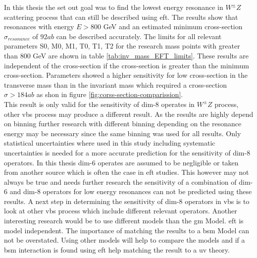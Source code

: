 \documentclass[../Bachelorarbeit.tex]{subfiles}
\begin{document}
\label{sec:summery}
In this thesis the set out goal was to find the lowest energy resonance in $W^{\pm}Z$ scattering process that can still be described using \acrshort{eft}.
The results show that resonances with energy $E>800$ GeV and an estimated minimum cross-section $\sigma_{resonance}$ of $92 ab$ can be described accurately.
The limits for all relevant parameters S0, M0, M1, T0, T1, T2 for the research mass points with greater than 800 GeV are shown in table \ref{tab:inv_mass_EFT_limits}.
These results are independent of the cross-section if the cross-section is greater than the minimum cross-section. Parameters showed a higher sensitivity for low cross-section
in the transverse mass than in the invariant mass which required a cross-section $\sigma>184 ab$ as shon in figure \ref{fig:corss-section-comparission}.\\
This result is only valid for the sensitivity of dim-8 operates in $W^{\pm}Z$ process, other \acrshort{vbs} process may produce a different result.
As the results are highly depend on binning further research with different binning depending on the resonance energy may be necessary since the same binning was used for all results.
Only statistical uncertainties where used in this study including systematic uncertainties is needed for a more accurate prediction for the sensitivity of dim-8 operators.
In this thesis dim-6 operates are assumed to be negligible or taken from another source which is often the case in \acrshort{eft} studies.
This however may not always be true and needs further research the sensitivity of a combination of dim-6 and dim-8 operators for low energy resonances can not be predicted using these results.
A next step in determining the sensitivity of dim-8 operators in \acrshort{vbs} is to look at other \acrshort{vbs} process which include different relevant operators.
Another interesting research would be to use different models than the \acrshort{gm} Model. \acrshort{eft} is model independent. The importance of matching the results to a \acrshort{bsm} Model can not be overstated.
Using other models will help to compare the models and if a \acrshort{bsm} interaction is found using \acrshort{eft} help matching the result to a \acrshort{uv} theory.
\end{document}
